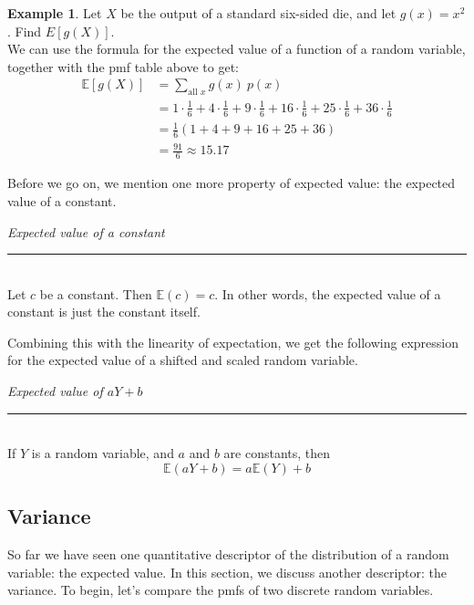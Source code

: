 \documentclass[12pt]{article}
\theoremstyle{definition}
\newtheorem*{example}{Example}
\theoremstyle{remark}
\def\E{{\mathbb E}}
\begin{document}
\begin{example}Let $X$ be the output of a standard six-sided die, and let $g(x) = x^2$. Find $E[g(X)]$.\\

We can use the formula for the expected value of a function of a random variable, together with the pmf table above to get:
\begin{align*}
\E[g(X)] &= \sum_{\text{all }x}g(x)\:p(x) \\
&= 1 \cdot \frac{1}{6} + 4 \cdot \frac{1}{6} + 9\cdot \frac{1}{6} + 16\cdot \frac{1}{6}+25\cdot \frac{1}{6}+36\cdot \frac{1}{6}\\
&= \frac{1}{6}(1 + 4 + 9 + 16 + 25 + 36)\\
&= \frac{91}{6} \approx 15.17
\end{align*}
\end{example}

Before we go on, we mention one more property of expected value: the expected value of a constant.

\begin{framed}
  \emph{Expected value of a constant}\\
  \rule{\dimexpr{}\fboxrule}{.1pt} \\
Let $c$ be a constant. Then $\E(c) = c$. In other words, the expected value of a constant is just the constant itself.
\end{framed}

Combining this with the linearity of expectation, we get the following expression for the expected value of a shifted and scaled random variable.
\begin{framed}
  \emph{Expected value of $aY + b$}\\
  \rule{\dimexpr{}\fboxrule}{.1pt} \\
If $Y$ is a random variable, and $a$ and $b$ are constants, then
\[
\E(aY + b) = a\E(Y) + b
\]
\end{framed}

\subsection{Variance}

So far we have seen one quantitative descriptor of the distribution of a random variable: the expected value. In this section, we discuss another descriptor: the variance. To begin, let's compare the pmfs of two discrete random variables.
\end{document}
